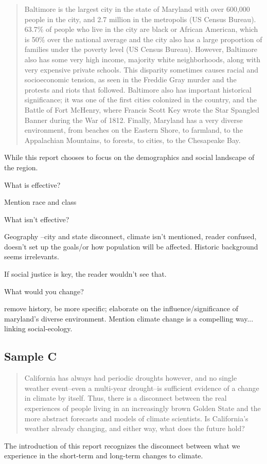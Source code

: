 \documentclass{article}\usepackage[]{graphicx}\usepackage[]{color}
\begin{document}
\begin{quote}
Baltimore is the largest city in the state of Maryland with over 600,000 people in the city, and 2.7 million in the metropolis (US Census Bureau). 63.7\% of people who live in the city are black or African American, which is 50\% over the national average and the city also has a large proportion of families under the poverty level (US Census Bureau). However, Baltimore also has some very high income, majority white neighborhoods, along with very expensive private schools. This disparity sometimes causes racial and socioeconomic tension, as seen in the Freddie Gray murder and the protests and riots that followed. Baltimore also has important historical significance; it was one of the first cities colonized in the country, and the Battle of Fort McHenry, where Francis Scott Key wrote the Star Spangled Banner during the War of 1812. Finally, Maryland has a very diverse environment, from beaches on the Eastern Shore, to farmland, to the Appalachian Mountains, to forests, to cities, to the Chesapeake Bay.
\end{quote}

While this report chooses to focus on the demographics and social landscape of the region. 

What is effective?

Mention race and class

What isn't effective?

Geography --city and state disconnect, climate isn't mentioned, reader confused, doesn't set up the goals/or how population will be affected.
Historic background seems irrelevants.

If social justice is key, the reader wouldn't see that.

What would you change?

remove history, be more specific; elaborate on the influence/significance of maryland's diverse environment. Mention climate change is a compelling way... linking social-ecology. 

\subsection{Sample C}

\begin{quote}
California has always had periodic droughts however, and no single weather event--even a multi-year drought--is sufficient evidence of a change in climate by itself. Thus, there is a disconnect between the real experiences of people living in an increasingly brown Golden State and the more abstract forecasts and models of climate scientists. Is California’s weather already changing, and either way, what does the future hold?
\end{quote}
The introduction of this report recognizes the disconnect between what we experience in the short-term and long-term changes to climate. 
\end{document}
